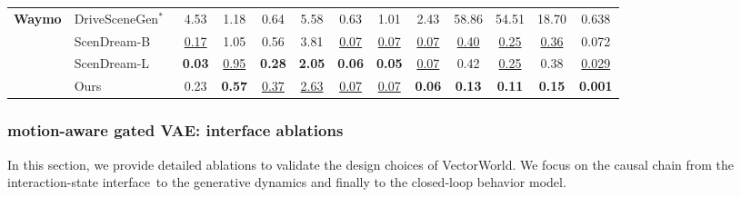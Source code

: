 \documentclass{article}
\newcommand{\best}[1]{\textbf{#1}}
\newcommand{\secbest}[1]{\underline{#1}}
\newcommand{\MotionVAE}{motion-aware gated VAE}
\newcommand{\InteractionState}{interaction-state interface}
\theoremstyle{plain}
\theoremstyle{definition}
\theoremstyle{remark}
\begin{document}
\begin{table}[t]
\begin{tabular}{@{}llccccccccccc@{}}
\midrule

\multirow{4}{*}{\textbf{Waymo}}
& DriveSceneGen$^{*}$~\cite{sun2024drivescenegen} & 4.53 & 1.18 & 0.64 & 5.58 & 0.63 & 1.01 & 2.43 & 58.86 & 54.51 & 18.70 & 0.638 \\
& ScenDream-B~\cite{rowe2025scenario} & \secbest{0.17} & 1.05 & 0.56 & 3.81 & \secbest{0.07} & \secbest{0.07} & \secbest{0.07} & \secbest{0.40} & \secbest{0.25} & \secbest{0.36} & 0.072 \\
& ScenDream-L~\cite{rowe2025scenario} & \best{0.03} & \secbest{0.95} & \best{0.28} & \best{2.05} & \best{0.06} & \best{0.05} & \secbest{0.07} & 0.42 & \secbest{0.25} & 0.38 & \secbest{0.029} \\
& \cellcolor{oursrow}Ours & \cellcolor{oursrow}0.23 & \cellcolor{oursrow}\best{0.57} & \cellcolor{oursrow}\secbest{0.37} & \cellcolor{oursrow}\secbest{2.63} & \cellcolor{oursrow}\secbest{0.07} & \cellcolor{oursrow}\secbest{0.07} & \cellcolor{oursrow}\best{0.06} & \cellcolor{oursrow}\best{0.13} & \cellcolor{oursrow}\best{0.11} & \cellcolor{oursrow}\best{0.15} & \cellcolor{oursrow}\best{0.001} \\

\bottomrule
\end{tabular}
\end{table}


\subsubsection{\MotionVAE: interface ablations}
\label{app:extraexp:vae}

In this section, we provide detailed ablations to validate the design choices of VectorWorld. We focus on the causal chain from the \InteractionState\ to the generative dynamics and finally to the closed-loop behavior model.
\end{document}
